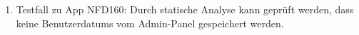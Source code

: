 \begin{enumerate}[label=\textbf{/T\arabic*0/}, align=left]
	\item Testfall zu App NFD160: Durch \gls{statische Analyse} kann geprüft werden, dass keine \Glspl{Benutzerdatum} vom \Gls{Admin-Panel} gespeichert werden.
\end{enumerate}